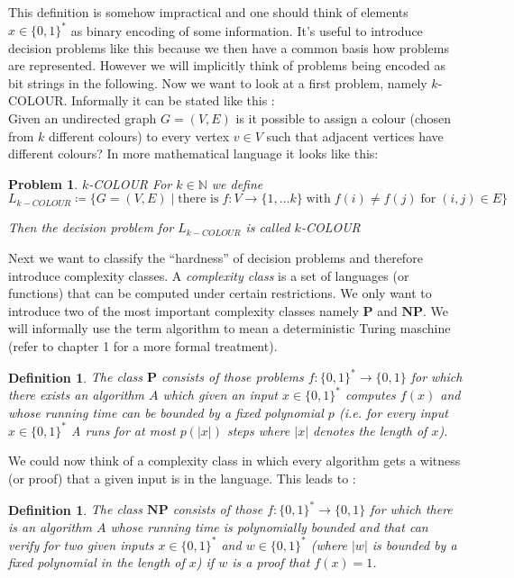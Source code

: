 \documentclass[12pt,a4paper]{scrartcl}
\newtheorem{Definition}[Theorem]{Definition}
\newtheorem{Problem}{Problem}
\numberwithin{equation}{section}
\newcommand{\N}{\mathbb{N}} %
\newcommand{\Pcomplexity}{\mathbf{P}}
\newcommand{\NPcomplexity}{\mathbf{NP}}
\begin{document}
This definition is somehow impractical and one should think of elements $x \in {\lbrace 0,1 \rbrace}^*$ as binary encoding
of some information. It's useful to introduce decision problems like this because we then have a common basis how problems
are represented. However we will implicitly think of problems being encoded as bit strings in the following. Now
we want to look at a first problem, namely $k$-COLOUR. Informally it can be stated like this : \\
 Given an undirected graph $ G = (V,E)$ is it possible to assign a colour (chosen from $k$ different colours) to every vertex 
 $v \in V$ such that adjacent vertices have different colours? In more mathematical language it looks like this:

\begin{Problem}{$k$-COLOUR}
 For $k \in \N$ we define $$L_{k-COLOUR} \coloneqq \lbrace G  = (V,E) \; | \; \text{there is} \; f \colon V \to \lbrace 1, \dotsc k \rbrace
 \; \text{with} \; f(i) \neq f(j) \; \text{for} \; (i,j) \in E \rbrace $$
 
 Then the decision problem for $L_{k-COLOUR}$ is called \emph{$k$-COLOUR}
\end{Problem}

Next we want to classify the ``hardness'' of decision problems and therefore introduce complexity classes. A \emph{complexity class}
 is a set of languages (or functions) that can be computed under certain restrictions. We only want to introduce two 
 of the most important complexity classes namely $\Pcomplexity$ and $\NPcomplexity$. We will informally use the term algorithm
 to mean a deterministic Turing maschine (refer to \cite{Arora2009} chapter 1 for a more formal treatment). 
 
\begin{Definition}
 The class $\Pcomplexity$ consists of those problems $f \colon {\lbrace 0,1 \rbrace}^* \to {\lbrace 0,1 \rbrace}$ for
 which there exists an algorithm $A$ which given an input $x \in {\lbrace 0,1 \rbrace}^*$
 computes $f(x)$ and whose running time can be bounded by a fixed polynomial $p$ (i.e.
 for every input $x \in {\lbrace 0,1 \rbrace}^*$ A runs for at most $p(|x|)$ steps where $|x|$ denotes the length of $x$).
\end{Definition}

We could now think of a complexity class in which every algorithm gets a witness (or proof) that a given input is in the language.
This leads to :

\begin{Definition}
 The class $\NPcomplexity$ consists of those $f \colon {\lbrace 0,1 \rbrace}^* \to {\lbrace 0,1 \rbrace}$ for which there is
 an algorithm $A$ whose running time is polynomially bounded and that can verify for two given inputs $x \in {\lbrace 0,1 \rbrace}^*$ and 
 $w \in {\lbrace 0,1 \rbrace}^*$ (where $|w|$ is bounded by a fixed polynomial in the length of $x$) if $w$ is a proof
 that $f(x) = 1$.
\end{Definition}
\end{document}
